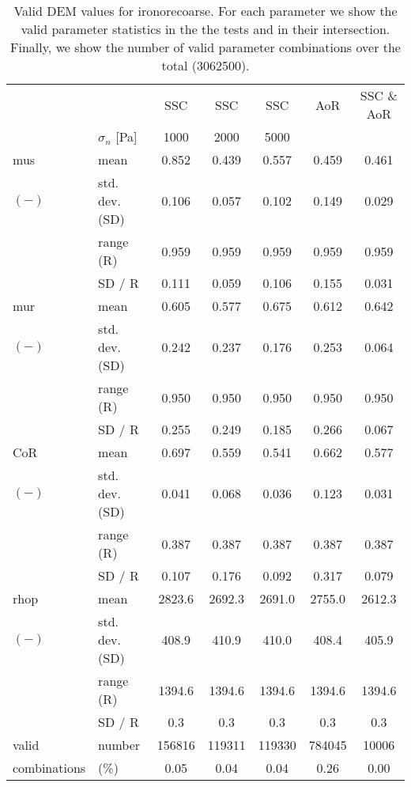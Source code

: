 \begin{table}[htbp] 
 \centering 
\begin{tabular}{ll|ccccc} 
 \hline 
 &    & SSC & SSC & SSC & AoR   & SSC \& AoR \\ 
 & $\sigma_n$  [Pa]  & 1000 & 2000 & 5000 &   &  \\ 
 \hline 
\acs{mus} & mean & 0.852 & 0.439 & 0.557 & 0.459 & 0.461 \\ 
$(-)$ & std. dev. (SD) & 0.106 & 0.057 & 0.102 & 0.149 & 0.029 \\ 
 & range (\acs{R}) & 0.959 & 0.959 & 0.959 & 0.959 & 0.959 \\ 
 & SD / R & 0.111 & 0.059 & 0.106 & 0.155 & 0.031 \\ 
 \hline 
\acs{mur} & mean & 0.605 & 0.577 & 0.675 & 0.612 & 0.642 \\ 
$(-)$ & std. dev. (SD) & 0.242 & 0.237 & 0.176 & 0.253 & 0.064 \\ 
 & range (\acs{R}) & 0.950 & 0.950 & 0.950 & 0.950 & 0.950 \\ 
 & SD / R & 0.255 & 0.249 & 0.185 & 0.266 & 0.067 \\ 
 \hline 
\acs{CoR} & mean & 0.697 & 0.559 & 0.541 & 0.662 & 0.577 \\ 
$(-)$ & std. dev. (SD) & 0.041 & 0.068 & 0.036 & 0.123 & 0.031 \\ 
 & range (\acs{R}) & 0.387 & 0.387 & 0.387 & 0.387 & 0.387 \\ 
 & SD / R & 0.107 & 0.176 & 0.092 & 0.317 & 0.079 \\ 
 \hline 
\acs{rhop} & mean & 2823.6 & 2692.3 & 2691.0 & 2755.0 & 2612.3 \\ 
$(-)$ & std. dev. (SD) & 408.9 & 410.9 & 410.0 & 408.4 & 405.9 \\ 
 & range (\acs{R}) & 1394.6 & 1394.6 & 1394.6 & 1394.6 & 1394.6 \\ 
 & SD / R &  0.3 &  0.3 &  0.3 &  0.3 &  0.3 \\ 
 \hline 
valid & number & 156816 & 119311 & 119330 & 784045 & 10006 \\ 
combinations & (\%)  & 0.05 & 0.04 & 0.04 & 0.26 & 0.00 \\ 
 \hline 
\end{tabular} 
\caption[Valid DEM values for ironorecoarse]{Valid DEM values for ironorecoarse. For each parameter we show the valid parameter statistics in the the tests and in their intersection. Finally, we show the number of valid parameter combinations over the total (3062500).} 
\label{tab:27DEMvalidvaluesironorecoarse} 
\end{table}